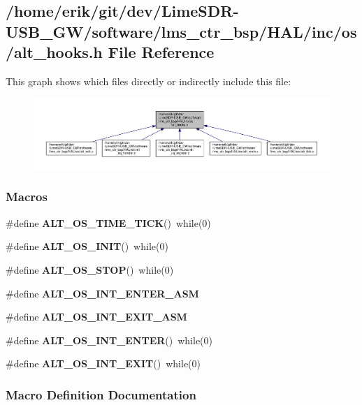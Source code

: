 \subsection{/home/erik/git/dev/\+Lime\+S\+D\+R-\/\+U\+S\+B\+\_\+\+G\+W/software/lms\+\_\+ctr\+\_\+bsp/\+H\+A\+L/inc/os/alt\+\_\+hooks.h File Reference}
\label{alt__hooks_8h}
This graph shows which files directly or indirectly include this file\+:
\nopagebreak
\begin{figure}[H]
\begin{center}
\leavevmode
\includegraphics[width=350pt]{d9/d40/alt__hooks_8h__dep__incl}
\end{center}
\end{figure}
\subsubsection*{Macros}
\begin{DoxyCompactItemize}
\item 
\#define {\bf A\+L\+T\+\_\+\+O\+S\+\_\+\+T\+I\+M\+E\+\_\+\+T\+I\+CK}()~while(0)
\item 
\#define {\bf A\+L\+T\+\_\+\+O\+S\+\_\+\+I\+N\+IT}()~while(0)
\item 
\#define {\bf A\+L\+T\+\_\+\+O\+S\+\_\+\+S\+T\+OP}()~while(0)
\item 
\#define {\bf A\+L\+T\+\_\+\+O\+S\+\_\+\+I\+N\+T\+\_\+\+E\+N\+T\+E\+R\+\_\+\+A\+SM}
\item 
\#define {\bf A\+L\+T\+\_\+\+O\+S\+\_\+\+I\+N\+T\+\_\+\+E\+X\+I\+T\+\_\+\+A\+SM}
\item 
\#define {\bf A\+L\+T\+\_\+\+O\+S\+\_\+\+I\+N\+T\+\_\+\+E\+N\+T\+ER}()~while(0)
\item 
\#define {\bf A\+L\+T\+\_\+\+O\+S\+\_\+\+I\+N\+T\+\_\+\+E\+X\+IT}()~while(0)
\end{DoxyCompactItemize}


\subsubsection{Macro Definition Documentation}
